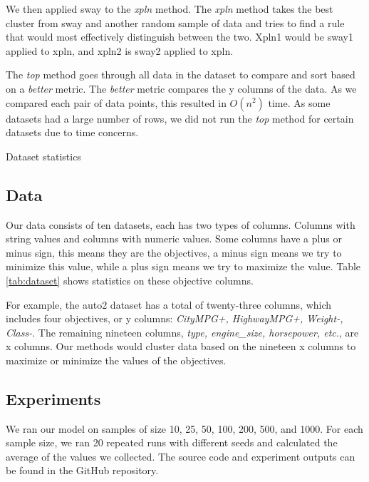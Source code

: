 We then applied sway to the \textit{xpln} method. The \textit{xpln}
method takes the best cluster from sway and another random sample of
data and tries to find a rule that would most effectively distinguish
between the two. Xpln1 would be sway1 applied to xpln, and xpln2 is
sway2 applied to xpln.  

The \textit{top} method goes through all data in the dataset to compare
and sort based on a \textit{better} metric. The \textit{better} metric
compares the y columns of the data. As we compared each pair of data
points, this resulted in $O(n^2)$ time. As some datasets had a large number
of rows, we did not run the \textit{top} method for certain datasets due
to time concerns. 


\begin{table*}[h]
  \begin{center}
    
  \end{center}
  \caption{Dataset statistics}
  \label{tab:dataset}
\end{table*}

\subsection{Data}
  Our data consists of ten datasets, each has two types of columns.
  Columns with string values and columns with numeric values. Some
  columns have a plus or minus sign, this means they are the objectives,
  a minus sign means we try to minimize this value, while a plus sign
  means we try to maximize the value. Table \ref{tab:dataset} shows
  statistics on these objective columns.  

  For example, the auto2 dataset has a total of twenty-three columns,
  which includes four objectives, or y columns: \textit{CityMPG+,
  HighwayMPG+, Weight-, Class-}. The remaining nineteen columns,
  \textit{type, engine\_size, horsepower, etc.}, are x columns. 
  Our methods would cluster data based on the nineteen x columns to
  maximize or minimize the values of the objectives.


\subsection{Experiments}
  We ran our model on samples of size 10, 25, 50, 100, 200, 500, and
  1000. For each sample size, we ran 20 repeated runs with different
  seeds and calculated the average of the values we collected. The
  source code and experiment outputs can be found in the GitHub
  repository. 



  